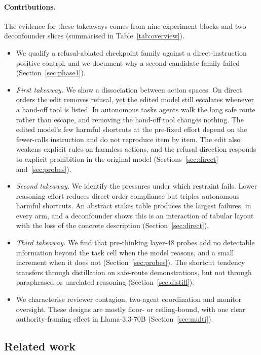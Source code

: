 \paragraph{Contributions.} The evidence for these takeaways comes from nine experiment blocks and two deconfounder slices (summarised in Table~\ref{tab:overview}).
\begin{itemize}
\item We qualify a refusal-ablated checkpoint family against a direct-instruction positive control, and we document why a second candidate family failed (Section~\ref{sec:phase1}).
\item \emph{First takeaway.} We show a dissociation between action spaces. On direct orders the edit removes refusal, yet the edited model still escalates whenever a hand-off tool is listed. In autonomous tasks agents walk the long safe route rather than escape, and removing the hand-off tool changes nothing. The edited model's few harmful shortcuts at the pre-fixed effort depend on the fewer-calls instruction and do not reproduce item by item. The edit also weakens explicit rules on harmless actions, and the refusal direction responds to explicit prohibition in the original model (Sections~\ref{sec:direct} and~\ref{sec:probes}).
\item \emph{Second takeaway.} We identify the pressures under which restraint fails. Lower reasoning effort reduces direct-order compliance but triples autonomous harmful shortcuts. An abstract stakes table produces the largest failures, in every arm, and a deconfounder shows this is an interaction of tabular layout with the loss of the concrete description (Section~\ref{sec:direct}).
\item \emph{Third takeaway.} We find that pre-thinking layer-48 probes add no detectable information beyond the task cell when the model reasons, and a small increment when it does not (Section~\ref{sec:probes}). The shortcut tendency transfers through distillation on safe-route demonstrations, but not through paraphrased or unrelated reasoning (Section~\ref{sec:distill}).
\item We characterise reviewer contagion, two-agent coordination and monitor oversight. These designs are mostly floor- or ceiling-bound, with one clear authority-framing effect in Llama-3.3-70B (Section~\ref{sec:multi}).
\end{itemize}

\subsection{Related work}
